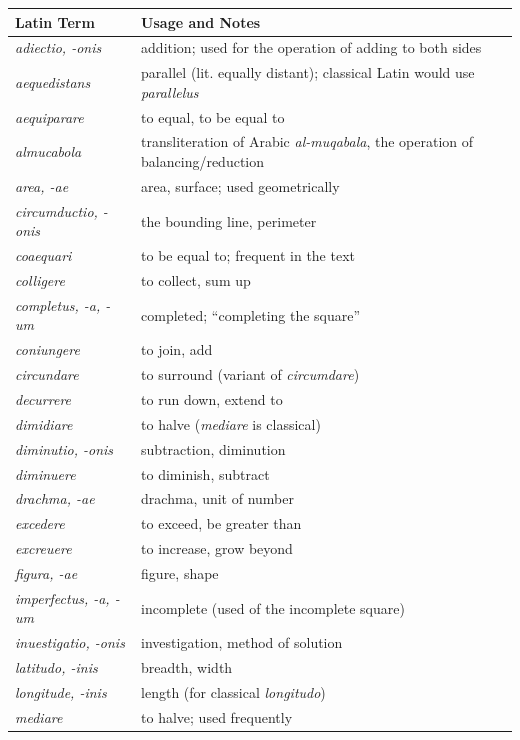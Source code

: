 \documentclass[11pt,a4paper]{book}
\begin{document}
\begin{longtable}{p{}p{}}
\toprule
\textbf{Latin Term} & \textbf{Usage and Notes} \\
\midrule
\endhead
\textit{adiectio, -onis} & addition; used for the operation of adding to both sides \\
\textit{aequedistans} & parallel (lit. equally distant); classical Latin would use \textit{parallelus} \\
\textit{aequiparare} & to equal, to be equal to \\
\textit{almucabola} & transliteration of Arabic \textit{al-muqabala}, the operation of balancing/reduction \\
\textit{area, -ae} & area, surface; used geometrically \\
\textit{circumductio, -onis} & the bounding line, perimeter \\
\textit{coaequari} & to be equal to; frequent in the text \\
\textit{colligere} & to collect, sum up \\
\textit{completus, -a, -um} & completed; ``completing the square'' \\
\textit{coniungere} & to join, add \\
\textit{circundare} & to surround (variant of \textit{circumdare}) \\
\textit{decurrere} & to run down, extend to \\
\textit{dimidiare} & to halve (\textit{mediare} is classical) \\
\textit{diminutio, -onis} & subtraction, diminution \\
\textit{diminuere} & to diminish, subtract \\
\textit{drachma, -ae} & drachma, unit of number \\
\textit{excedere} & to exceed, be greater than \\
\textit{excreuere} & to increase, grow beyond \\
\textit{figura, -ae} & figure, shape \\
\textit{imperfectus, -a, -um} & incomplete (used of the incomplete square) \\
\textit{inuestigatio, -onis} & investigation, method of solution \\
\textit{latitudo, -inis} & breadth, width \\
\textit{longitude, -inis} & length (for classical \textit{longitudo}) \\
\textit{mediare} & to halve; used frequently \\

\end{longtable}
\end{document}
